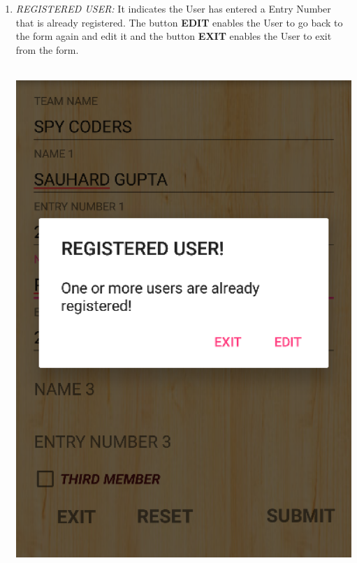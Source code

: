 \documentclass[12pt]{article}
\begin{document}
\begin{itemize}
\begin{enumerate}
\begin{enumerate}
            \item \textit{REGISTERED USER:} It indicates the User has entered a Entry Number that is already registered. The button \textbf{EDIT} enables the User to go back to the form again and edit it and the button \textbf{EXIT} enables the User to exit from the form.
            \\
            \\
            \begin{minipage}{\linewidth}
	        \centering
	        \includegraphics[scale=.7]{REGISTERED_USER.png}
            \end{minipage}
            \\
            \\

        \end{enumerate}
        \end{enumerate}
        

\end{itemize}
\end{document}
